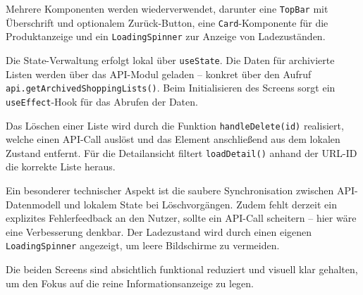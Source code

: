 Mehrere Komponenten werden wiederverwendet, darunter eine \texttt{TopBar} mit Überschrift und optionalem Zurück-Button, eine \texttt{Card}-Komponente für die Produktanzeige und ein \texttt{LoadingSpinner} zur Anzeige von Ladezuständen.

Die State-Verwaltung erfolgt lokal über \texttt{useState}. Die Daten für archivierte Listen werden über das API-Modul geladen – konkret über den Aufruf \texttt{api.getArchivedShoppingLists()}. Beim Initialisieren des Screens sorgt ein \texttt{useEffect}-Hook für das Abrufen der Daten.

Das Löschen einer Liste wird durch die Funktion \texttt{handleDelete(id)} realisiert, welche einen API-Call auslöst und das Element anschließend aus dem lokalen Zustand entfernt. Für die Detailansicht filtert \texttt{loadDetail()} anhand der URL-ID die korrekte Liste heraus.

Ein besonderer technischer Aspekt ist die saubere Synchronisation zwischen API-Datenmodell und lokalem State bei Löschvorgängen. Zudem fehlt derzeit ein explizites Fehlerfeedback an den Nutzer, sollte ein API-Call scheitern – hier wäre eine Verbesserung denkbar. Der Ladezustand wird durch einen eigenen \texttt{LoadingSpinner} angezeigt, um leere Bildschirme zu vermeiden.

Die beiden Screens sind absichtlich funktional reduziert und visuell klar gehalten, um den Fokus auf die reine Informationsanzeige zu legen.
